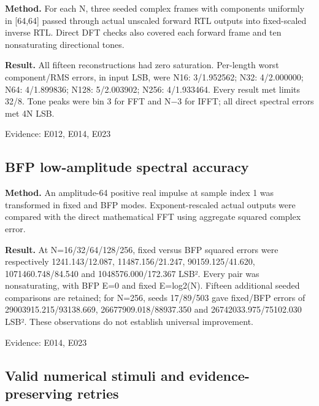 \documentclass[11pt,a4paper]{article}
\begin{document}
\textbf{Method.} For each N,\allowbreak{} three seeded complex frames with components uniformly in [64,\allowbreak{}64]\allowbreak{} passed through actual unscaled forward RTL outputs into fixed-scaled inverse RTL. Direct DFT checks also covered each forward frame and ten nonsaturating directional tones.

\textbf{Result.} All fifteen reconstructions had zero saturation. Per-length worst component/\allowbreak{}RMS errors,\allowbreak{} in input LSB,\allowbreak{} were N16: 3/\allowbreak{}1.952562; N32: 4/\allowbreak{}2.000000; N64: 4/\allowbreak{}1.899836; N128: 5/\allowbreak{}2.003902; N256: 4/\allowbreak{}1.933464. Every result met limits 32/\allowbreak{}8. Tone peaks were bin 3 for FFT and N{\vulcanmathsymbols −}3 for IFFT; all direct spectral errors met 4N LSB.

{\small Evidence: E012,\allowbreak{} E014,\allowbreak{} E023}

\subsection{BFP low-amplitude spectral accuracy}

\textbf{Method.} An amplitude-64 positive real impulse at sample index 1 was transformed in fixed and BFP modes. Exponent-rescaled actual outputs were compared with the direct mathematical FFT using aggregate squared complex error.

\textbf{Result.} At N=\allowbreak{}16/\allowbreak{}32/\allowbreak{}64/\allowbreak{}128/\allowbreak{}256,\allowbreak{} fixed versus BFP squared errors were respectively 1241.143/\allowbreak{}12.087,\allowbreak{} 11487.156/\allowbreak{}21.247,\allowbreak{} 90159.125/\allowbreak{}41.620,\allowbreak{} 1071460.748/\allowbreak{}84.540 and 1048576.000/\allowbreak{}172.367 LSB². Every pair was nonsaturating,\allowbreak{} with BFP E=\allowbreak{}0 and fixed E=\allowbreak{}log2(\allowbreak{}N)\allowbreak{}. Fifteen additional seeded comparisons are retained; for N=\allowbreak{}256,\allowbreak{} seeds 17/\allowbreak{}89/\allowbreak{}503 gave fixed/\allowbreak{}BFP errors of 29003915.215/\allowbreak{}93138.669,\allowbreak{} 26677909.018/\allowbreak{}88937.350 and 26742033.975/\allowbreak{}75102.030 LSB². These observations do not establish universal improvement.

{\small Evidence: E014,\allowbreak{} E023}

\subsection{Valid numerical stimuli and evidence-preserving retries}
\end{document}

